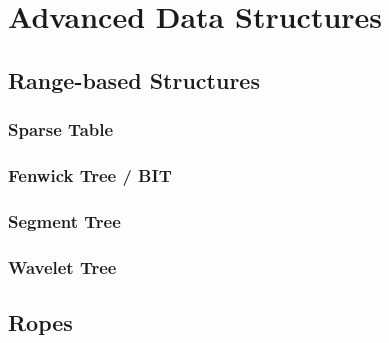 \section{Advanced Data Structures}
\subsection{Range-based Structures}
\subsubsection{Sparse Table}
\subsubsection{Fenwick Tree / BIT}
\subsubsection{Segment Tree}
\subsubsection{Wavelet Tree}
\subsection{Ropes}
